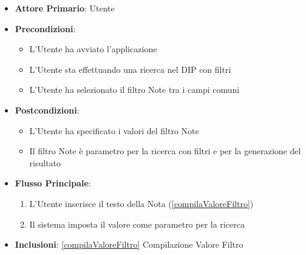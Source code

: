 \begin{itemize}
      \item \textbf{Attore Primario}: Utente
      \item \textbf{Precondizioni}: \begin{itemize}
            \item L'Utente ha avviato l'applicazione
            \item L'Utente sta effettuando una ricerca nel DIP con filtri
            \item L'Utente ha selezionato il filtro Note tra i campi comuni
      \end{itemize}
      \item \textbf{Postcondizioni}: \begin{itemize}
            \item L'Utente ha specificato i valori del filtro Note
            \item Il filtro Note è parametro per la ricerca con filtri e per la generazione del risultato
      \end{itemize}
      \item \textbf{Flusso Principale}:
            \begin{enumerate}
                  \item L'Utente inserisce il testo della Nota (\ref{compilaValoreFiltro})
                  \item Il sistema imposta il valore come parametro per la ricerca
            \end{enumerate}
      \item \textbf{Inclusioni}: \ref{compilaValoreFiltro} Compilazione Valore Filtro
\end{itemize}

